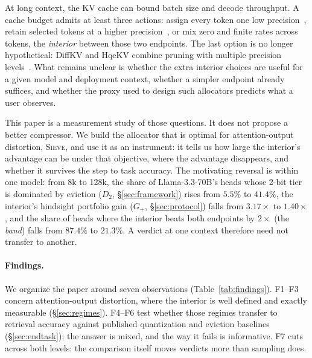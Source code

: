 \documentclass{article}
\newcommand{\sieve}{\textsc{Sieve}}
\newcommand{\gplus}{G_{+}}
\theoremstyle{definition}
\begin{document}
At long context, the KV cache can bound batch size and decode throughput.  A cache budget admits at least three actions: assign every token one low precision~\citep{liu2024kivi,hooper2024kvquant,zandieh2025turboquant}, retain selected tokens at a higher precision~\citep{zhang2023h2o,liu2023scissorhands,li2024snapkv,xiao2024streamingllm}, or mix zero and finite rates across tokens, the \emph{interior} between those two endpoints.  The last option is no longer hypothetical: DiffKV and HqeKV combine pruning with multiple precision levels~\citep{zhang2025diffkv,wang-etal-2026-hqekv}.  What remains unclear is whether the extra interior choices are useful for a given model and deployment context, whether a simpler endpoint already suffices, and whether the proxy used to design such allocators predicts what a user observes.

This paper is a measurement study of those questions.  It does not propose a better compressor.  We build the allocator that is optimal for attention-output distortion, \sieve{}, and use it as an instrument: it tells us how large the interior's advantage can be under that objective, where the advantage disappears, and whether it survives the step to task accuracy.  The motivating reversal is within one model: from 8k to 128k, the share of Llama-3.3-70B's heads whose 2-bit tier is dominated by eviction ($D_2$, \S\ref{sec:framework}) rises from $5.5\%$ to $41.4\%$, the interior's hindsight portfolio gain ($\gplus$, \S\ref{sec:protocol}) falls from $3.17\times$ to $1.40\times$, and the share of heads where the interior beats both endpoints by $2\times$ (the \emph{band}) falls from $87.4\%$ to $21.3\%$.  A verdict at one context therefore need not transfer to another.

\paragraph{Findings.}  We organize the paper around seven observations (Table~\ref{tab:findings}).  F1--F3 concern attention-output distortion, where the interior is well defined and exactly measurable (\S\ref{sec:regimes}).  F4--F6 test whether those regimes transfer to retrieval accuracy against published quantization and eviction baselines (\S\ref{sec:endtask}); the answer is mixed, and the way it fails is informative.  F7 cuts across both levels: the comparison itself moves verdicts more than sampling does.
\end{document}
